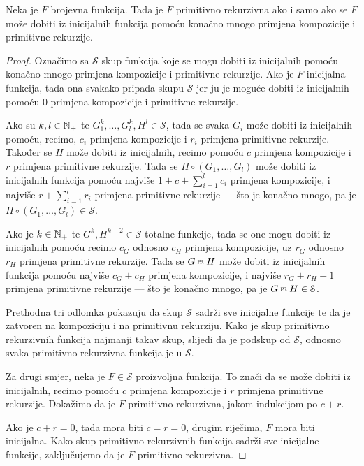 \begin{propozicija}[{name=[simboličke definicije primitivno rekurzivnih funkcija]}]\label{prop:symbdef}
Neka je $F$ brojevna funkcija. Tada je $F$ primitivno rekurzivna ako i samo ako se $F$ može dobiti iz inicijalnih funkcija pomoću konačno mnogo primjena kompozicije i primitivne rekurzije.
\end{propozicija}
\begin{proof}
Označimo sa $\mathcal S$ skup funkcija koje se mogu dobiti iz inicijalnih pomoću ko\-nač\-no mnogo primjena kompozicije i primitivne rekurzije. Ako je $F$ inicijalna funkcija, tada ona svakako pripada skupu $\mathcal S$ jer ju je moguće dobiti iz inicijalnih pomoću $0$ primjena kompozicije i primitivne rekurzije.

Ako su $k,l\in{\mathbb N}_+$ te $G_1^k,\dotsc,G_l^k,H^l\in\mathcal S$, tada se svaka $G_i$ može dobiti iz inicijalnih pomoću, recimo, $c_i$ primjena kompozicije i $r_i$ primjena primitivne rekurzije. Također se $H$ može dobiti iz inicijalnih, recimo pomoću $c$ primjena kompozicije i $r$ primjena primitivne rekurzije. Tada se $H\circ(G_1,\dotsc,G_l)$ može dobiti iz inicijalnih funkcija pomoću najviše $1+c+\sum_{i=1}^lc_i$ primjena kompozicije, i najviše $r+\sum_{i=1}^lr_i$ primjena primitivne rekurzije --- što je konačno mnogo, pa je $H\circ(G_1,\dotsc,G_l)\in\mathcal S$.

Ako je $k\in{\mathbb N}_+$ te $G^k,H^{k+2}\in\mathcal S$ totalne funkcije, tada se one mogu dobiti iz inicijalnih pomoću recimo $c_G$ odnosno $c_H$ primjena kompozicije, uz $r_G$ odnosno $r_H$ primjena primitivne rekurzije. Tada se $G\pr H$ može dobiti iz inicijalnih funkcija pomoću najviše $c_G+c_H$ primjena kompozicije, i najviše $r_G+r_H+1$ primjena primitivne rekurzije --- što je konačno mnogo, pa je $G\pr H\in\mathcal S$.

Prethodna tri odlomka pokazuju da skup $\mathcal S$ sadrži sve inicijalne funkcije te da je zatvoren na kompoziciju i na primitivnu rekurziju. Kako je skup primitivno rekurzivnih funkcija najmanji takav skup, slijedi da je podskup od $\mathcal S$, odnosno svaka primitivno rekurzivna funkcija je u $\mathcal S$.

Za drugi smjer, neka je $F\in\mathcal S$ proizvoljna funkcija. To znači da se može dobiti iz inicijalnih, recimo pomoću $c$ primjena kompozicije i $r$ primjena primitivne rekurzije. Dokažimo da je $F$ primitivno rekurzivna, jakom indukcijom po $c+r$.

Ako je $c+r=0$, tada mora biti $c=r=0$, drugim riječima, $F$ mora biti inicijalna. Kako skup primitivno rekurzivnih funkcija sadrži sve inicijalne funkcije, zaključujemo da je $F$ primitivno rekurzivna.


\end{proof}
